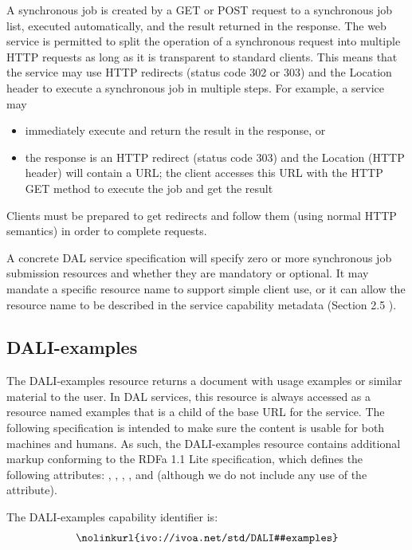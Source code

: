 \documentclass[11pt,letter]{ivoa}
\begin{document}
A synchronous job is created by a GET or POST request to a synchronous job list, 
executed automatically, and the result returned in the response. The web service 
is permitted to split the operation of a synchronous request into multiple HTTP 
requests as long as it is transparent to standard clients. This means that the 
service may use HTTP redirects (status code 302 or 303) and the Location header 
to execute a synchronous job in multiple steps. For example, a service may

\begin{itemize}
\item immediately execute and return the result in the response, or 
\item the response is an HTTP redirect (status code 303) and the Location (HTTP 
header) will contain a URL; the client accesses this URL with the HTTP GET 
method to execute the job and get the result 
\end{itemize}

Clients must be prepared to get redirects and follow them (using normal HTTP 
semantics) in order to complete requests.

A concrete DAL service specification will specify zero or more synchronous job 
submission resources and whether they are mandatory or optional. It may mandate 
a specific resource name to support simple client use, or it can allow the 
resource name to be described in the service capability metadata (Section 2.5 ).

\subsection{DALI-examples}
\label{sec:dali-examples}
The DALI-examples resource returns a document with usage examples or similar 
material to the user. In DAL services, this resource is always accessed as a 
resource named examples that is a child of the base URL for the service. The 
following specification is intended to make sure the content is usable for both 
machines and humans. As such, the DALI-examples resource contains additional 
markup conforming to the RDFa 1.1 Lite \citep{std:RDFaLite11} specification, 
which defines the 
following attributes: , , ,
, and  (although we 
do not include any use of the  attribute).

The DALI-examples capability identifier is:
$$
\hbox{\nolinkurl{ivo://ivoa.net/std/DALI#examples}}
$$
\end{document}
